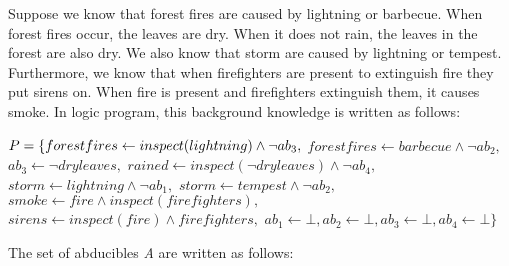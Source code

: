 \documentclass[]{interact}
\theoremstyle{plain}%
\theoremstyle{definition}
\theoremstyle{remark}
\begin{document}
Suppose we know that forest fires are caused by lightning or barbecue. When forest fires occur, the leaves are dry. When it does not rain, the leaves in the forest are also dry. We also know that storm are caused by lightning or tempest. Furthermore, we know that when firefighters are present to extinguish fire they put sirens on. When fire is present and firefighters extinguish them, it causes smoke. In logic program, this background knowledge is written as follows:

\hfill\begin{minipage}{\dimexpr\textwidth-1cm}
    \begin{flushleft}
        \(  P = \{
        \linebreak
        forestfires \leftarrow inspect(lightning) \wedge  \neg ab_3, \)
        \linebreak
        \( forestfires \leftarrow barbecue \wedge  \neg ab_2,\)
        \linebreak
        \(ab_3 \leftarrow \neg dryleaves,\)
        \linebreak
        \( rained \leftarrow inspect(\neg dryleaves) \wedge  \neg ab_4,\)
        \linebreak
        \( storm \leftarrow lightning \wedge  \neg ab_1,\)
        \linebreak
        \( storm \leftarrow tempest \wedge  \neg ab_2,\)
        \linebreak
        \( smoke \leftarrow fire \wedge  inspect(firefighters),\)
        \linebreak
        \( sirens \leftarrow inspect(fire) \wedge  firefighters,\)
        \linebreak
        \( ab_1 \leftarrow \bot , ab_2 \leftarrow \bot ,  ab_3 \leftarrow \bot ,  ab_4 \leftarrow \bot \}\)
    \end{flushleft}
\end{minipage}

The set of abducibles \textit{A} are written as follows:
\end{document}
